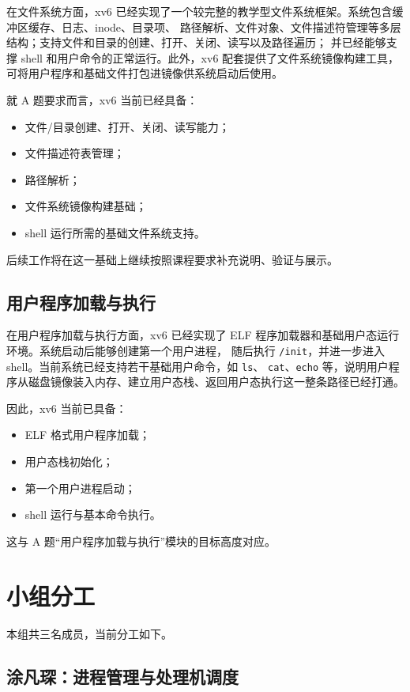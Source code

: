 \documentclass[12pt,a4paper]{ctexart}
\begin{document}
在文件系统方面，xv6 已经实现了一个较完整的教学型文件系统框架。系统包含缓冲区缓存、日志、inode、目录项、
路径解析、文件对象、文件描述符管理等多层结构；支持文件和目录的创建、打开、关闭、读写以及路径遍历；
并已经能够支撑 shell 和用户命令的正常运行。此外，xv6 配套提供了文件系统镜像构建工具，
可将用户程序和基础文件打包进镜像供系统启动后使用。

就 A 题要求而言，xv6 当前已经具备：

\begin{itemize}
  \item 文件/目录创建、打开、关闭、读写能力；
  \item 文件描述符表管理；
  \item 路径解析；
  \item 文件系统镜像构建基础；
  \item shell 运行所需的基础文件系统支持。
\end{itemize}

后续工作将在这一基础上继续按照课程要求补充说明、验证与展示。

\subsection{用户程序加载与执行}

在用户程序加载与执行方面，xv6 已经实现了 ELF 程序加载器和基础用户态运行环境。系统启动后能够创建第一个用户进程，
随后执行 \texttt{/init}，并进一步进入 shell。当前系统已经支持若干基础用户命令，如 \texttt{ls}、
\texttt{cat}、\texttt{echo} 等，说明用户程序从磁盘镜像装入内存、建立用户态栈、返回用户态执行这一整条路径已经打通。

因此，xv6 当前已具备：

\begin{itemize}
  \item ELF 格式用户程序加载；
  \item 用户态栈初始化；
  \item 第一个用户进程启动；
  \item shell 运行与基本命令执行。
\end{itemize}

这与 A 题“用户程序加载与执行”模块的目标高度对应。

\section{小组分工}

本组共三名成员，当前分工如下。

\subsection{涂凡琛：进程管理与处理机调度}
\end{document}
